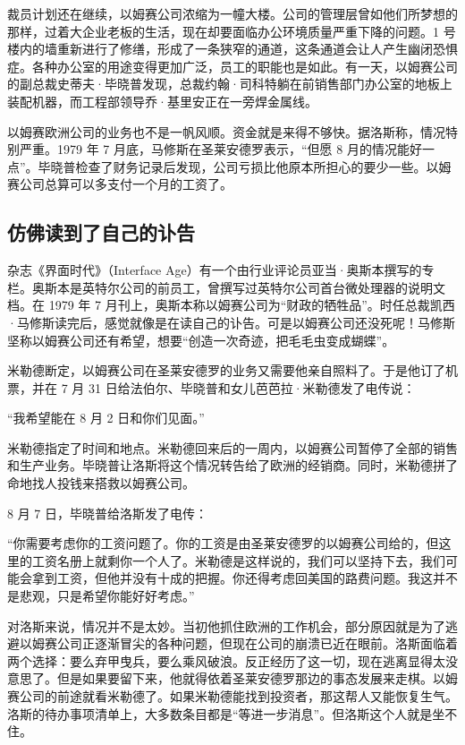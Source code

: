 \documentclass[12pt,UTF8]{ctexbook}
\begin{document}
裁员计划还在继续，以姆赛公司浓缩为一幢大楼。公司的管理层曾如他们所梦想的那样，过着大企业老板的生活，现在却要面临办公环境质量严重下降的问题。1 号楼内的墙重新进行了修缮，形成了一条狭窄的通道，这条通道会让人产生幽闭恐惧症。各种办公室的用途变得更加广泛，员工的职能也是如此。有一天，以姆赛公司的副总裁史蒂夫·毕晓普发现，总裁约翰·司科特躺在前销售部门办公室的地板上装配机器，而工程部领导乔·基里安正在一旁焊金属线。

以姆赛欧洲公司的业务也不是一帆风顺。资金就是来得不够快。据洛斯称，情况特别严重。1979 年 7 月底，马修斯在圣莱安德罗表示，“但愿 8 月的情况能好一点”。毕晓普检查了财务记录后发现，公司亏损比他原本所担心的要少一些。以姆赛公司总算可以多支付一个月的工资了。





\subsection{仿佛读到了自己的讣告}


杂志《界面时代》（Interface Age）有一个由行业评论员亚当·奥斯本撰写的专栏。奥斯本是英特尔公司的前员工，曾撰写过英特尔公司首台微处理器的说明文档。在 1979 年 7 月刊上，奥斯本称以姆赛公司为“财政的牺牲品”。时任总裁凯西·马修斯读完后，感觉就像是在读自己的讣告。可是以姆赛公司还没死呢！马修斯坚称以姆赛公司还有希望，想要“创造一次奇迹，把毛毛虫变成蝴蝶”。

米勒德断定，以姆赛公司在圣莱安德罗的业务又需要他亲自照料了。于是他订了机票，并在 7 月 31 日给法伯尔、毕晓普和女儿芭芭拉·米勒德发了电传说：

“我希望能在 8 月 2 日和你们见面。”

米勒德指定了时间和地点。米勒德回来后的一周内，以姆赛公司暂停了全部的销售和生产业务。毕晓普让洛斯将这个情况转告给了欧洲的经销商。同时，米勒德拼了命地找人投钱来搭救以姆赛公司。

8 月 7 日，毕晓普给洛斯发了电传：

“你需要考虑你的工资问题了。你的工资是由圣莱安德罗的以姆赛公司给的，但这里的工资名册上就剩你一个人了。米勒德是这样说的，我们可以坚持下去，我们可能会拿到工资，但他并没有十成的把握。你还得考虑回美国的路费问题。我这并不是悲观，只是希望你能好好考虑。”

对洛斯来说，情况并不是太妙。当初他抓住欧洲的工作机会，部分原因就是为了逃避以姆赛公司正逐渐冒尖的各种问题，但现在公司的崩溃已近在眼前。洛斯面临着两个选择：要么弃甲曳兵，要么乘风破浪。反正经历了这一切，现在逃离显得太没意思了。但是如果要留下来，他就得依着圣莱安德罗那边的事态发展来走棋。以姆赛公司的前途就看米勒德了。如果米勒德能找到投资者，那这帮人又能恢复生气。洛斯的待办事项清单上，大多数条目都是“等进一步消息”。但洛斯这个人就是坐不住。
\end{document}
